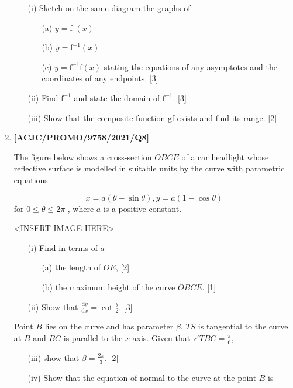\documentclass[twoside,english]{article}
\begin{document}
\begin{enumerate}
\begin{enumerate}
\item[(i)]  Sketch on the same diagram the graphs of 
\begin{enumerate}
\item[(a)]  $y=\text{f }\left(x\right)$
\item[(b)]  $y=\text{f}^{-1}\left(x\right)$
\item[(c)]  $y=\text{f}^{-1}\text{f}\left(x\right)$ stating the equations of
any asymptotes and the coordinates of any endpoints. \hfill{} {[}3{]}
\end{enumerate}
\item[(ii)]  Find $\text{f}^{-1}$ and state the domain of $\text{f}^{-1}$.
\hfill{}{[}3{]}
\item[(iii)]  Show that the composite function $\text{gf}$ exists and find its
range. \hfill{}{[}2{]}
\end{enumerate}

 \newpage 

\item \textbf{{[}ACJC/PROMO/9758/2021/Q8{]}}

The figure below shows a cross-section $OBCE$ of a car headlight
whose reflective surface is modelled in suitable units by the curve
with parametric equations

\[
x=a(\theta-\sin\theta),y=a(1-\cos\theta)
\]
 for $0\le\theta\le2\pi$ , where $a$ is a positive constant.
\noindent \begin{center}
<INSERT IMAGE HERE>
\par\end{center}
\begin{enumerate}
\item[(i)]  Find in terms of $a$ 
\begin{enumerate}
\item[(a)]  the length of $OE$, \hfill{} {[}2{]}
\item[(b)]  the maximum height of the curve $OBCE$. \hfill{}{[}1{]}
\end{enumerate}
\item[(ii)]  Show that $\frac{\text{d}y}{\text{d}x}=\cot\frac{\theta}{2}$. \hfill{}
{[}3{]}
\end{enumerate}
Point $B$ lies on the curve and has parameter $\beta$. $TS$ is
tangential to the curve at $B$ and $BC$ is parallel to the $x$-axis.
Given that $\angle TBC=\frac{\pi}{6}$, 
\begin{enumerate}
\item[(iii)]  show that $\beta=\frac{2\pi}{3}$. \hfill{}{[}2{]}
\item[(iv)]  Show that the equation of normal to the curve at the point $B$
is 


\end{enumerate}
\end{enumerate}
\end{document}

